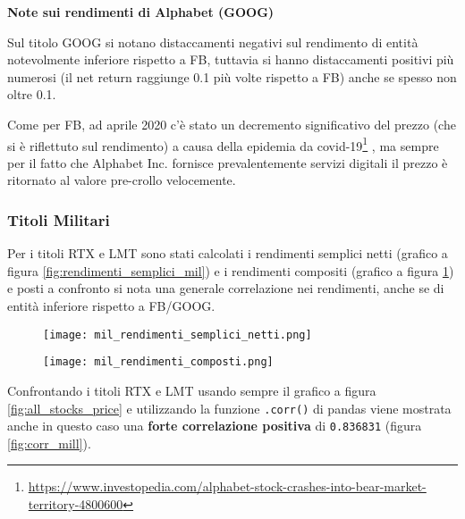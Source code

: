 \textbf{Note sui rendimenti di Alphabet (GOOG)}

Sul titolo GOOG si notano distaccamenti negativi sul rendimento di entità notevolmente inferiore rispetto a FB, tuttavia si hanno distaccamenti positivi più numerosi (il net return raggiunge 0.1 più volte rispetto a FB) anche se spesso non oltre 0.1.

Come per FB, ad aprile 2020 c'è stato un decremento significativo del prezzo (che si è riflettuto sul rendimento) a causa della epidemia da 
covid-19\footnote{
  \href{https://www.investopedia.com/alphabet-stock-crashes-into-bear-market-territory-4800600}{https://www.investopedia.com/alphabet-stock-crashes-into-bear-market-territory-4800600}
}
, ma sempre per il fatto che Alphabet Inc. fornisce
prevalentemente servizi digitali il prezzo è ritornato al valore pre-crollo velocemente.

\subsubsection{Titoli Militari}

Per i titoli RTX e LMT sono stati calcolati i rendimenti semplici netti (grafico a figura \ref{fig:rendimenti_semplici_mil}) e i rendimenti compositi (grafico a figura \ref{fig:rendimenti_compositi_mil}) e posti a confronto
si nota una generale correlazione nei rendimenti, anche se di entità inferiore rispetto a FB/GOOG.

\begin{figure}[h]
  \centering
  \begin{minipage}{.5\textwidth}
    \centering
    \texttt{[image: mil\_rendimenti\_semplici\_netti.png]}
    \label{fig:rendimenti_semplici_mil}
  \end{minipage}%
  \begin{minipage}{.5\textwidth}
    \centering
    \texttt{[image: mil\_rendimenti\_composti.png]}
    \label{fig:rendimenti_compositi_mil}
  \end{minipage}
\end{figure}

Confrontando i titoli RTX e LMT usando sempre il grafico a figura \ref{fig:all_stocks_price} e utilizzando la funzione \verb|.corr()| di pandas
viene mostrata anche in questo caso una \textbf{forte correlazione positiva} di \verb|0.836831| (figura \ref{fig:corr_mill}).

